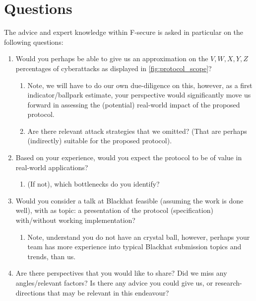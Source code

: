 \section{Questions}
\label{sec:questions}
The advice and expert knowledge within F-secure is asked in particular on the following questions:
\begin{enumerate}
    \item Would you perhaps be able to give us an approximation on the $V,W,X,Y,Z$ percentages of cyberattacks as displayed in \cref{fig:protocol_scope}? 
    \begin{enumerate}
        \item Note, we will have to do our own due-diligence on this, however, as a first indicator/ballpark estimate, your perspective would significantly move us forward in assessing the (potential) real-world impact of the proposed protocol. 
        \item Are there relevant attack strategies that we omitted? (That are perhaps (indirectly) suitable for the proposed protocol).
    \end{enumerate}
    \item Based on your experience, would you expect the protocol to be of value in real-world applications?
    \begin{enumerate}
        \item (If not), which bottlenecks do you identify?
    \end{enumerate}
    \item Would you consider a talk at Blackhat feasible (assuming the work is done well), with as topic: a presentation of the protocol (specification) with/without working implementation?
    \begin{enumerate}
        \item Note, understand you do not have an crystal ball, however, perhaps your team has more experience into typical Blackhat submission topics and trends, than us.
    \end{enumerate}
    \item Are there perspectives that you would like to share? Did we miss any angles/relevant factors? Is there any advice you could give us, or research-directions that may be relevant in this endeavour?
\end{enumerate}